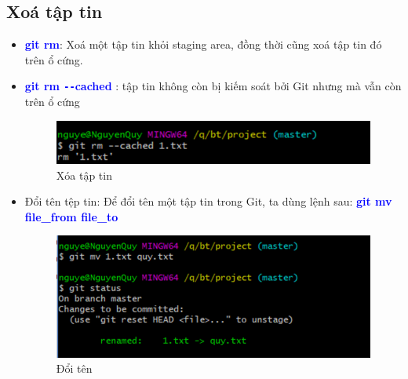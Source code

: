 \documentclass[12pt,a4paper]{report}
\begin{document}
\subsection{Xoá tập tin} 
\begin{itemize}
\item \textcolor{blue}{\bf git rm}: Xoá một tập tin khỏi staging area, đồng thời cũng xoá tập tin đó trên ổ cứng.
\item \textcolor{blue}{\bf git rm \texttt{-{}-}cached} : tập tin không còn bị kiếm soát bởi Git nhưng mà vẫn còn trên ổ cứng

\begin{figure}[!ht]
	\centering
	\includegraphics[width=0.8\linewidth]{screenshot015}
	\caption{Xóa tập tin}
	\label{fig:screenshot015}
	\end{figure}
	
\item Đổi tên tệp tin: Để đổi tên một tập tin trong Git, ta dùng lệnh sau: \textcolor{blue}{\bf git mv file\_from file\_to}

\begin{figure}[!ht]
	\centering
	\includegraphics[width=0.8\linewidth]{screenshot016}
	\caption{Đổi tên}
	\label{fig:screenshot016}
	\end{figure}
\end{itemize}
\end{document}
